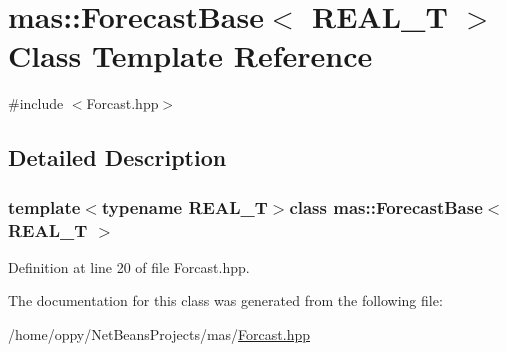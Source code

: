 \hypertarget{classmas_1_1_forecast_base}{\section{mas\-:\-:Forecast\-Base$<$ R\-E\-A\-L\-\_\-\-T $>$ Class Template Reference}
\label{classmas_1_1_forecast_base}
}


{\ttfamily \#include $<$Forcast.\-hpp$>$}



\subsection{Detailed Description}
\subsubsection*{template$<$typename R\-E\-A\-L\-\_\-\-T$>$class mas\-::\-Forecast\-Base$<$ R\-E\-A\-L\-\_\-\-T $>$}



Definition at line 20 of file Forcast.\-hpp.



The documentation for this class was generated from the following file\-:\begin{DoxyCompactItemize}
\item 
/home/oppy/\-Net\-Beans\-Projects/mas/\hyperlink{_forcast_8hpp}{Forcast.\-hpp}\end{DoxyCompactItemize}
